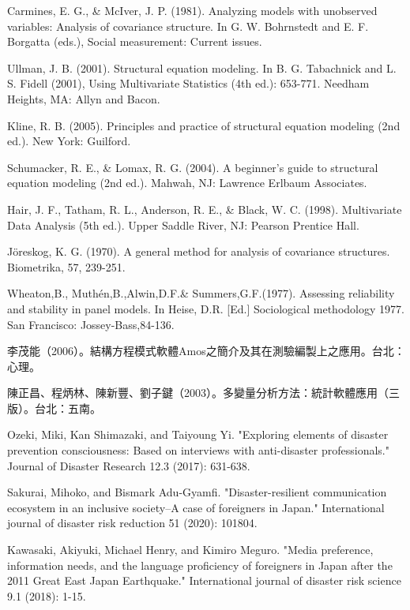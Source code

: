 \documentclass[letterpaper,12pt,titlepage,oneside,final,a4j,dvipdfmx]{book}
\begin{document}
\begin{thebibliography}{70}
 Carmines, E. G., \& McIver, J. P. (1981). Analyzing models with unobserved variables: Analysis of covariance structure. In G. W. Bohrnstedt and E. F. Borgatta (eds.), Social measurement: Current issues.

 Ullman, J. B. (2001). Structural equation modeling. In B. G. Tabachnick and L. S. Fidell (2001), Using Multivariate Statistics (4th ed.): 653-771. Needham Heights, MA: Allyn and Bacon.

 Kline, R. B. (2005). Principles and practice of structural equation modeling (2nd ed.). New York: Guilford.

 Schumacker, R. E., \& Lomax, R. G. (2004). A beginner's guide to structural equation modeling (2nd ed.). Mahwah, NJ: Lawrence Erlbaum Associates.

 Hair, J. F., Tatham, R. L., Anderson, R. E., \& Black, W. C. (1998). Multivariate Data Analysis (5th ed.). Upper Saddle River, NJ: Pearson Prentice Hall.

 Jöreskog, K. G. (1970). A general method for analysis of covariance structures. Biometrika, 57, 239-251.

 Wheaton,B., Muthén,B.,Alwin,D.F.\& Summers,G.F.(1977). Assessing reliability and stability in panel models. In Heise, D.R. [Ed.] Sociological methodology 1977. San Francisco: Jossey-Bass,84-136.

 李茂能（2006）。結構方程模式軟體Amos之簡介及其在測驗編製上之應用。台北：心理。

 陳正昌、程炳林、陳新豐、劉子鍵（2003）。多變量分析方法：統計軟體應用（三版）。台北：五南。

 Ozeki, Miki, Kan Shimazaki, and Taiyoung Yi. "Exploring elements of disaster prevention consciousness: Based on interviews with anti-disaster professionals." Journal of Disaster Research 12.3 (2017): 631-638.

 Sakurai, Mihoko, and Bismark Adu-Gyamfi. "Disaster-resilient communication ecosystem in an inclusive society–A case of foreigners in Japan." International journal of disaster risk reduction 51 (2020): 101804.

 Kawasaki, Akiyuki, Michael Henry, and Kimiro Meguro. "Media preference, information needs, and the language proficiency of foreigners in Japan after the 2011 Great East Japan Earthquake." International journal of disaster risk science 9.1 (2018): 1-15.


\end{thebibliography}
\end{document}
